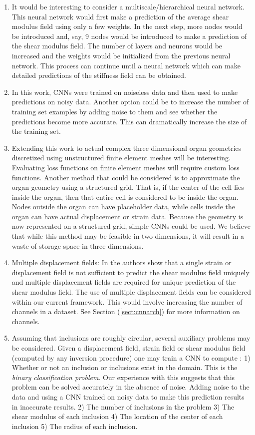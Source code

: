 \documentclass[12pt]{article}
\begin{document}
\begin{enumerate}
\item{It would be interesting to consider a multiscale/hierarchical neural network. This neural network would first make a prediction of the average shear modulus field using only a few weights. In the next step, more nodes would be introduced and, say, 9 nodes would be introduced to make a prediction of the shear modulus field. The number of layers and neurons would be increased and the weights would be initialized from the previous neural network. This process can continue until a neural network which can make detailed predictions of the stiffness field can be obtained.}
\item{In this work, CNNs were trained on noiseless data and then used to make predictions on noisy data. Another option could be to increase the number of training set examples by adding noise to them and see whether the predictions become more accurate. This can dramatically increase the size of the training set.}
\item{Extending this work to actual complex three dimensional organ geometries discretized using unstructured finite element meshes will be interesting. Evaluating loss functions on finite element meshes will require custom loss functions. Another method that could be considered is to approximate the organ geometry using a structured grid. That is, if the center of the cell lies inside the organ, then that entire cell is considered to be inside the organ. Nodes outside the organ can have placeholder data, while cells inside the organ can have actual displacement or strain data. Because the geometry is now represented on a structured grid, simple CNNs could be used. We believe that while this method may be feasible in two dimensions, it will result in a waste of storage space in three dimensions.}
\item{Multiple displacement fields: In \cite{paper:barbonegokhale,paper:barbonebamber} the authors show that a single strain or displacement field is not sufficient to predict the shear modulus field uniquely and multiple displacement fields are required for unique prediction of the shear modulus field. The use of multiple displacement fields can be considered within our current framework. This would involve increasing the number of channels in a dataset. See Section (\ref{sect:cnnarch}) for more information on channels.} 
\item{Assuming that inclusions are roughly circular, several auxiliary problems may be considered. Given a displacement field, strain field or shear modulus field (computed by any inversion procedure) one may train a CNN to compute : 1) Whether or not an inclusion or inclusions exist  in the domain. This is the \textit{binary classification problem}. Our experience with this suggests that this problem can be solved accurately in the absence of noise.  Adding noise to the data and using a CNN trained on noisy data to make this prediction results in inaccurate results. 2) The number of inclusions in the problem 3) The shear modulus of each inclusion 4) The location of the center of each inclusion 5) The radius of each inclusion.}

\end{enumerate}
\end{document}
